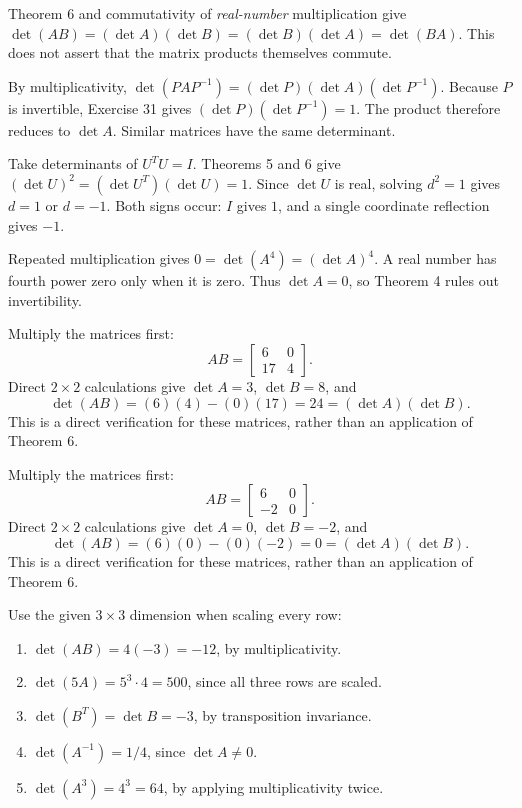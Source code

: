 Theorem 6 and commutativity of \emph{real-number} multiplication give $\det(AB)=(\det A)(\det B)=(\det B)(\det A)=\det(BA)$. This does not assert that the matrix products themselves commute.

By multiplicativity, $\det(PAP^{-1})=(\det P)(\det A)(\det P^{-1})$. Because $P$ is invertible, Exercise 31 gives $(\det P)(\det P^{-1})=1$. The product therefore reduces to $\det A$. Similar matrices have the same determinant.

Take determinants of $U^TU=I$. Theorems 5 and 6 give $(\det U)^2=(\det U^T)(\det U)=1$. Since $\det U$ is real, solving $d^2=1$ gives $d=1$ or $d=-1$. Both signs occur: $I$ gives $1$, and a single coordinate reflection gives $-1$.

Repeated multiplication gives $0=\det(A^4)=(\det A)^4$. A real number has fourth power zero only when it is zero. Thus $\det A=0$, so Theorem 4 rules out invertibility.

Multiply the matrices first:
\[AB=\begin{bmatrix}6&0\\17&4\end{bmatrix}.\]
Direct $2\times2$ calculations give $\det A=3$, $\det B=8$, and
\[\det(AB)=(6)(4)-(0)(17)=24=(\det A)(\det B).\]
This is a direct verification for these matrices, rather than an application of Theorem 6.

Multiply the matrices first:
\[AB=\begin{bmatrix}6&0\\-2&0\end{bmatrix}.\]
Direct $2\times2$ calculations give $\det A=0$, $\det B=-2$, and
\[\det(AB)=(6)(0)-(0)(-2)=0=(\det A)(\det B).\]
This is a direct verification for these matrices, rather than an application of Theorem 6.

Use the given $3\times3$ dimension when scaling every row:
\begin{enumerate}[label=(\alph*)]
\item $\det(AB)=4(-3)=-12$, by multiplicativity.
\item $\det(5A)=5^3\cdot4=500$, since all three rows are scaled.
\item $\det(B^T)=\det B=-3$, by transposition invariance.
\item $\det(A^{-1})=1/4$, since $\det A\ne0$.
\item $\det(A^3)=4^3=64$, by applying multiplicativity twice.
\end{enumerate}

